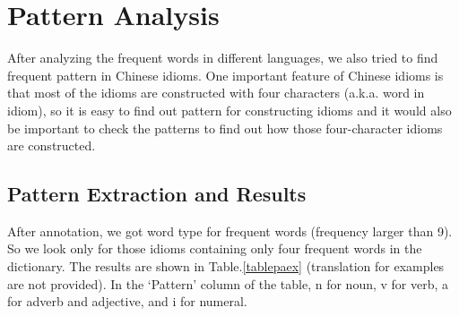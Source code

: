 \section{Pattern Analysis}
After analyzing the frequent words in different languages, we also tried to find frequent pattern in Chinese idioms. One important feature of Chinese idioms is that most of the idioms are constructed with four characters (a.k.a. word in idiom), so it is easy to find out pattern for constructing idioms and it would also be important to check the patterns to find out how those four-character idioms are constructed. 

\subsection{Pattern Extraction and Results}
After annotation, we got word type for frequent words (frequency larger than 9). So we look only for those idioms containing only four frequent words in the dictionary. The results are shown in Table.\ref{tablepaex} (translation for examples are not provided). In the `Pattern' column of the table, n for noun, v for verb, a for adverb and adjective, and i for numeral. 

